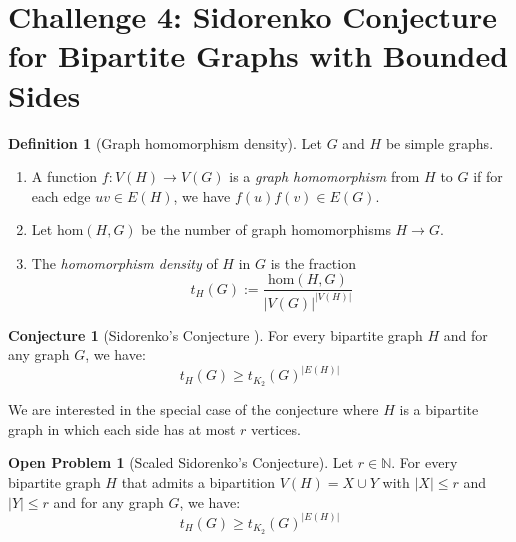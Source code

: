 \documentclass[12pt]{article}
\numberwithin{equation}{section}
\theoremstyle{definition}
\newtheorem{definition}{Definition}
\newtheorem{conjecture}[theorem]{Conjecture}
\newtheorem{openproblem}[theorem]{Open Problem}
\newcommand{\ev}[1]{( #1 )}
\newcommand{\N}{\mathbb{N}}
\begin{document}
\section*{Challenge 4: Sidorenko Conjecture for Bipartite Graphs with Bounded Sides}

\begin{definition}[Graph homomorphism density]
Let $G$ and $H$ be simple graphs.
\begin{enumerate}
\item A function $f: V\ev{H} \rightarrow V\ev{G}$ is a \textit{graph homomorphism} from $H$ to $G$ if for each edge $uv \in E\ev{H}$, we have $f\ev{u}f\ev{v} \in E\ev{G}$. 

\item Let $\mathrm{hom}\ev{H,G}$ be the number of graph homomorphisms $H \rightarrow G$. 

\item The \textit{homomorphism density} of $H$ in $G$ is the fraction
$$
t_{H}\ev{G} := \dfrac{\mathrm{hom}\ev{H,G}}{|V\ev{G}|^{|V\ev{H}|}}
$$
\end{enumerate}
\end{definition}

\begin{conjecture}[Sidorenko's Conjecture \mbox{\cite{sidorenko}}]
For every bipartite graph $H$ and for any graph $G$, we have:
$$
t_H\ev{G} \geq t_{K_2}\ev{G}^{|E\ev{H}|}
$$
\end{conjecture}

We are interested in the special case of the conjecture where $H$ is a bipartite graph in which each side has at most $r$ vertices.
\begin{openproblem}[Scaled Sidorenko's Conjecture]
Let $r \in \N$. For every bipartite graph $H$ that admits a bipartition $V\ev{H} = X \cup Y$ with $|X| \leq r$ and $|Y| \leq r$ and for any graph $G$, we have:
$$
t_H\ev{G} \geq t_{K_2}\ev{G}^{|E\ev{H}|}
$$
\end{openproblem}

\printbibliography
\end{document}
